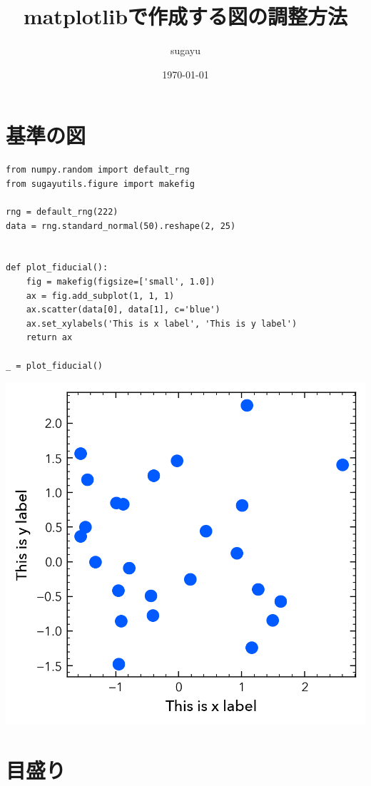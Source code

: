 \documentclass[a4paper, 10pt, notitlepage, twocolumn, uplatex, oneside, dvipdfmx]{jsarticle}
\author{sugayu}
\date{\today}
\title{\textbf{matplotlibで作成する図の調整方法}}
\begin{document}
\maketitle
\tableofcontents

\section{基準の図}
\label{sec:orgdf1d5a3}
\begin{verbatim}
from numpy.random import default_rng
from sugayutils.figure import makefig

rng = default_rng(222)
data = rng.standard_normal(50).reshape(2, 25)


def plot_fiducial():
    fig = makefig(figsize=['small', 1.0])
    ax = fig.add_subplot(1, 1, 1)
    ax.scatter(data[0], data[1], c='blue')
    ax.set_xylabels('This is x label', 'This is y label')
    return ax

_ = plot_fiducial()
\end{verbatim}

\begin{center}
\includegraphics[width=1.0\linewidth]{./obipy-resources/fiducial.png}
\end{center}
\section{目盛り}
\label{sec:org69eaf0a}
\end{document}
